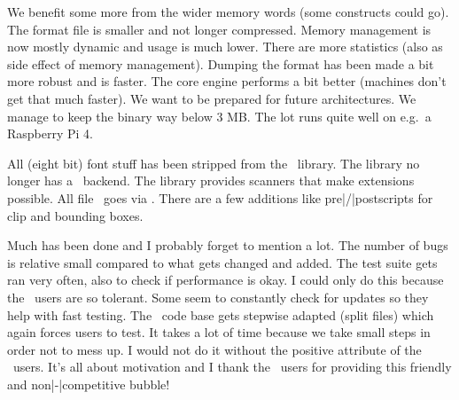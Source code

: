 \stopitemize

\stoptitle

\starttitle[title=Efficiency]

\startitemize

\startitem
    We benefit some more from the wider memory words (some constructs could go).
\stopitem
\startitem
    The format file is smaller and not longer compressed.
\stopitem
\startitem
    Memory management is now mostly dynamic and usage is much lower.
\stopitem
\startitem
    There are more statistics (also as side effect of memory management).
\stopitem
\startitem
    Dumping the format has been made a bit more robust and is faster.
\stopitem
\startitem
    The core engine performs a bit better (machines don't get that much faster).
\stopitem
\startitem
    We want to be prepared for future architectures.
\stopitem
\startitem
    We manage to keep the binary way below 3 MB.
\stopitem
\startitem
    The lot runs quite well on e.g.\ a Raspberry Pi 4.
\stopitem

\stopitemize

\starttitle[title=Upgraded \METAPOST]

\startitemize

\startitem
    All (eight bit) font stuff has been stripped from the \METAPOST\ library.
\stopitem
\startitem
    The library no longer has a \POSTSCRIPT\ backend.
\stopitem
\startitem
    The library provides scanners that make extensions possible.
\stopitem
\startitem
    All file \IO\ goes via \LUA.
\stopitem
\startitem
    There are a few additions like pre|/|postscripts for clip and bounding boxes.
\stopitem
\stopitemize

\stoptitle

\starttitle[title=Praise for the users]

\startitemize

\startitem
    Much has been done and I probably forget to mention a lot.
\stopitem
\startitem
    The number of bugs is relative small compared to what gets changed and added.
\stopitem
\startitem
    The test suite gets ran very often, also to check if performance is okay.
\stopitem
\startitem
    I could only do this because the \CONTEXT\ users are so tolerant.
\stopitem
\startitem
    Some seem to constantly check for updates so they help with fast testing.
\stopitem
\startitem
    The \CONTEXT\ code base gets stepwise adapted (split files) which again
    forces users to test.
\stopitem
\startitem
    It takes a lot of time because we take small steps in order not to mess up.
\stopitem
\startitem
    I would not do it without the positive attribute of the \CONTEXT\ users.
\stopitem
\startitem
    It's all about motivation and I thank the \CONTEXT\ users for providing this
    friendly and non|-|competitive bubble!
\stopitem

